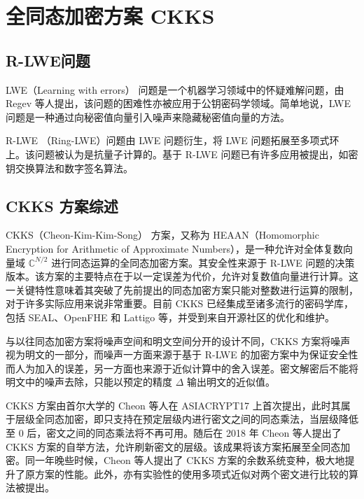\section{全同态加密方案 CKKS}

\subsection{R-LWE问题}

LWE（Learning with errors） 问题是一个机器学习领域中的怀疑难解问题，由 Regev 等人提出\cite{10.1145/1568318.1568324}，该问题的困难性亦被应用于公钥密码学领域。简单地说，LWE 问题是一种通过向秘密值向量引入噪声来隐藏秘密值向量的方法。


R-LWE （Ring-LWE）问题由 LWE 问题衍生，将 LWE 问题拓展至多项式环上。该问题被认为是抗量子计算的。基于 R-LWE 问题已有许多应用被提出，如密钥交换算法\cite{cryptoeprint:2012/688}和数字签名算法\cite{cryptoeprint:2011/537}。


\subsection{CKKS 方案综述}

CKKS（Cheon-Kim-Kim-Song） 方案，又称为 HEAAN（Homomorphic Encryption for Arithmetic of Approximate Numbers），是一种允许对全体复数向量域 $\mathbb{C}^{N/2}$ 进行同态运算的全同态加密方案。其安全性来源于 R-LWE 问题的决策版本。该方案的主要特点在于以一定误差为代价，允许对复数值向量进行计算。这一关键特性意味着其突破了先前提出的同态加密方案只能对整数进行运算的限制，对于许多实际应用来说非常重要。目前 CKKS 已经集成至诸多流行的密码学库，包括 SEAL、OpenFHE 和 Lattigo 等\cite{sealcrypto,OpenFHE,Mouchet2020LattigoAM}，并受到来自开源社区的优化和维护。

与以往同态加密方案将噪声空间和明文空间分开的设计不同，CKKS 方案将噪声视为明文的一部分，而噪声一方面来源于基于 R-LWE 的加密方案中为保证安全性而人为加入的误差，另一方面也来源于近似计算中的舍入误差。密文解密后不能将明文中的噪声去除，只能以预定的精度 $\Delta$ 输出明文的近似值。\cite{CKKS_optimize}

CKKS 方案由首尔大学的 Cheon 等人在 ASIACRYPT17 上首次提出\cite{cryptoeprint:2016/421}，此时其属于层级全同态加密，即只支持在预定层级内进行密文之间的同态乘法，当层级降低至 0 后，密文之间的同态乘法将不再可用。随后在 2018 年 Cheon 等人提出了 CKKS 方案的自举方法\cite{cryptoeprint:2018/153}，允许刷新密文的层级。该成果将该方案拓展至全同态加密。同一年晚些时候，Cheon 等人提出了 CKKS 方案的余数系统变种，极大地提升了原方案的性能。\cite{cryptoeprint:2018/931}此外，亦有实验性的使用多项式近似对两个密文进行比较的算法被提出\cite{cryptoeprint:2019/417,cryptoeprint:2019/1234,cryptoeprint:2020/834}。

